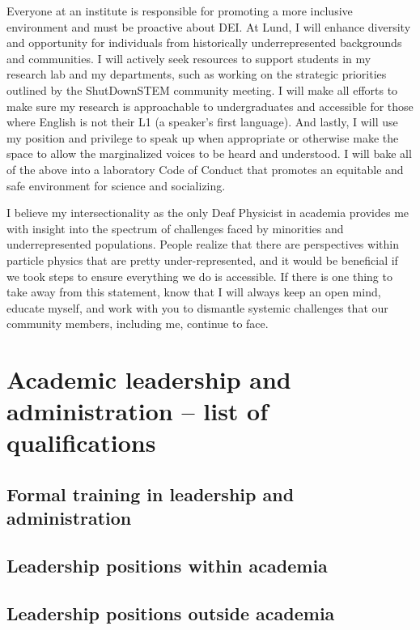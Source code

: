 Everyone at an institute is responsible for promoting a more inclusive environment and must be proactive about DEI. At Lund, I will enhance diversity and opportunity for individuals from historically underrepresented backgrounds and communities. I will actively seek resources to support students in my research lab and my departments, such as working on the strategic priorities outlined by the ShutDownSTEM community meeting. I will make all efforts to make sure my research is approachable to undergraduates and accessible for those where English is not their L1 (a speaker's first language). And lastly, I will use my position and privilege to speak up when appropriate or otherwise make the space to allow the marginalized voices to be heard and understood. I will bake all of the above into a laboratory Code of Conduct that promotes an equitable and safe environment for science and socializing.

I believe my intersectionality as the only Deaf Physicist in academia provides me with insight into the spectrum of challenges faced by minorities and underrepresented populations. People realize that there are perspectives within particle physics that are pretty under-represented, and it would be beneficial if we took steps to ensure everything we do is accessible. If there is one thing to take away from this statement, know that I will always keep an open mind, educate myself, and work with you to dismantle systemic challenges that our community members, including me, continue to face.

\section{Academic leadership and administration -- list of qualifications} \label{sec:academic-leadership-and-administration-list-of-qualifications}
\subsection{Formal training in leadership and administration \noneyet} \label{ssec:formal-training-in-leadership-and-administration-noneyet}
\subsection{Leadership positions within academia} \label{ssec:leadership-positions-within-academia}
\subsection{Leadership positions outside academia} \label{ssec:leadership-positions-outside-academia}
